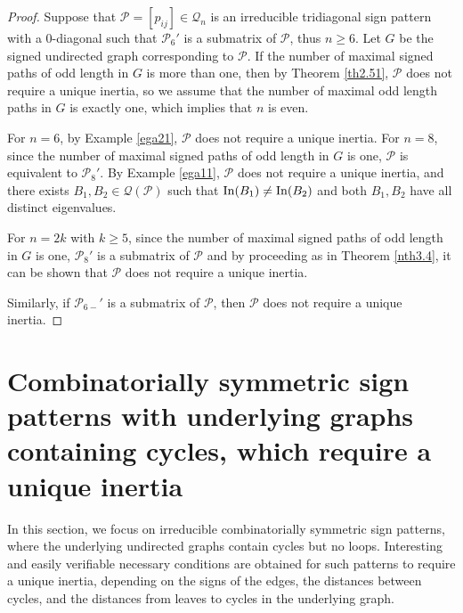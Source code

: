 \documentclass[a4paper, 10pt]{article}
\numberwithin{equation}{section}
\def\In{{\rm In}}
\begin{document}
\begin{proof}
	Suppose that $\mathcal{P}=[p_{ij}]\in \mathcal{Q}_n$ is an irreducible tridiagonal sign pattern with a $0$-diagonal such that $\mathcal{P}_6'$ is a submatrix of $\mathcal{P}$, thus $n\geq 6$. Let $G$ be the signed undirected graph corresponding to $\mathcal{P}$. If the number of maximal signed paths of odd length in $G$ is more than one, then by Theorem \ref{th2.51}, $\mathcal{P}$ does not require a unique inertia, so we assume that the number of maximal odd length paths in $G$ is exactly one, which implies that $n$ is even.
	
	For $n=6$, by Example \ref{ega21}, $\mathcal{P}$ does not require a unique inertia. For $n=8$, since the number of maximal signed paths of odd length in $G$ is one, $\mathcal{P}$ is equivalent to $\mathcal{P}_8'$. By Example \ref{ega11}, $\mathcal{P}$ does not require a unique inertia, and there exists $B_1, B_2\in \mathcal{Q}(\mathcal{P})$ such that $\In(B_1)\neq \In(B_2)$ and both $B_1, B_2$ have all distinct eigenvalues.
	
	For $n=2k$ with $k\geq5$, since the number of maximal signed paths of odd length in $G$ is one, $\mathcal{P}_8'$ is a submatrix of $\mathcal{P}$ and by proceeding as in Theorem \ref{nth3.4}, it can be shown that $\mathcal{P}$ does not require a unique inertia.
	
	Similarly, if ${\mathcal{P}_{6-}'}$ is a submatrix of $\mathcal{P}$, then $\mathcal{P}$ does not require a unique inertia.
\end{proof} 






\section{Combinatorially symmetric sign patterns with underlying graphs containing cycles, which require a unique inertia} \label{s4}

In this section, we focus on irreducible combinatorially symmetric sign patterns, where the underlying undirected graphs contain cycles but no loops. Interesting and easily verifiable necessary conditions are obtained for such patterns to require a unique inertia, depending on the signs of the edges, the distances between cycles, and the distances from leaves to cycles in the underlying graph.
\end{document}

